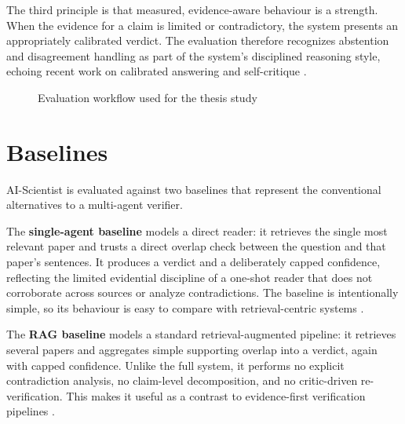 The third principle is that measured, evidence-aware behaviour is a strength. When the evidence for a claim is
limited or contradictory, the system presents an appropriately calibrated verdict. The evaluation therefore
recognizes abstention and disagreement handling as part of the system's disciplined reasoning style, echoing recent
work on calibrated answering and self-critique \cite{kadavath2022language,shinn2023reflexion}.

\begin{figure}[!htbp]
\centering
{}
\caption{Evaluation workflow used for the thesis study}
\label{fig:evaluation_workflow}
\end{figure}

\section{Baselines }

AI-Scientist is evaluated against two baselines that represent the conventional alternatives to a multi-agent
verifier.

The \textbf{single-agent baseline} models a direct reader: it retrieves the single most relevant paper and trusts a
direct overlap check between the question and that paper's sentences. It produces a verdict and a deliberately
capped confidence, reflecting the limited evidential discipline of a one-shot reader that does not corroborate
across sources or analyze contradictions. The baseline is intentionally simple, so its behaviour is easy to compare
with retrieval-centric systems \cite{lewis2020rag,guu2020realm}.

The \textbf{RAG baseline} models a standard retrieval-augmented pipeline: it retrieves several papers and aggregates
simple supporting overlap into a verdict, again with capped confidence. Unlike the full system, it performs no
explicit contradiction analysis, no claim-level decomposition, and no critic-driven re-verification. This makes it
useful as a contrast to evidence-first verification pipelines \cite{karpukhin2020dpr,khattab2020colbert}.

